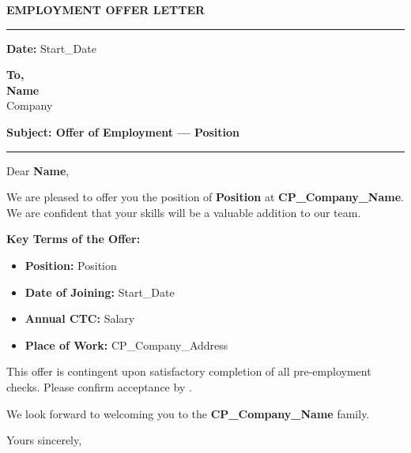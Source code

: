 \documentclass[9.5pt]{article}
\begin{document}
\vspace*{18pt}

{\fontsize{14pt}{17pt}\selectfont\bfseries\color{t2ldark}EMPLOYMENT OFFER LETTER}\par\vspace{2pt}
{\color{refgold}\rule{\linewidth}{1pt}}\par\vspace{7pt}

{\fontsize{9.5pt}{13pt}\selectfont\color{refcharcoal}%
  \textbf{Date:} {{Start_Date}}\par\vspace{4pt}%
  \textbf{To,}\\[1pt]\textbf{{{Name}}}\\{{Company}}%
}\par\vspace{7pt}

{\fontsize{9.5pt}{12.5pt}\selectfont\bfseries\color{t2ldark}%
  Subject: Offer of Employment --- {{Position}}%
}\par
{\color{refgold}\rule{0.40\linewidth}{0.6pt}}\par\vspace{7pt}

{\fontsize{9.5pt}{13.5pt}\selectfont\color{refcharcoal}

Dear \textbf{{{Name}}},

We are pleased to offer you the position of \textbf{{{Position}}} at
\textbf{{{CP_Company_Name}}}. We are confident that your skills will be a
valuable addition to our team.

\vspace{4pt}
\textbf{Key Terms of the Offer:}
\begin{itemize}[leftmargin=14pt, itemsep=0pt, topsep=1pt, parsep=0pt]
  \item \textbf{Position:} {{Position}}
  \item \textbf{Date of Joining:} {{Start_Date}}
  \item \textbf{Annual CTC:} {{Salary}}
  \item \textbf{Place of Work:} {{CP_Company_Address}}
\end{itemize}


\vspace{4pt}
This offer is contingent upon satisfactory completion of all pre-employment
checks. Please confirm acceptance by
.

\vspace{4pt}
We look forward to welcoming you to the \textbf{{{CP_Company_Name}}} family.

\vspace{7pt}
Yours sincerely,

}\par\vspace{8pt}
\end{document}
